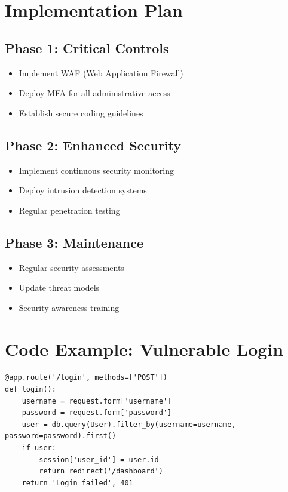 \documentclass{article}
\begin{document}
\section{Implementation Plan}

\subsection{Phase 1: Critical Controls}
\begin{itemize}
    \item Implement WAF (Web Application Firewall)
    \item Deploy MFA for all administrative access
    \item Establish secure coding guidelines
\end{itemize}

\subsection{Phase 2: Enhanced Security}
\begin{itemize}
    \item Implement continuous security monitoring
    \item Deploy intrusion detection systems
    \item Regular penetration testing
\end{itemize}

\subsection{Phase 3: Maintenance}
\begin{itemize}
    \item Regular security assessments
    \item Update threat models
    \item Security awareness training
\end{itemize}


\section{Code Example: Vulnerable Login}

\begin{verbatim}
@app.route('/login', methods=['POST'])
def login():
    username = request.form['username']
    password = request.form['password']
    user = db.query(User).filter_by(username=username, password=password).first()
    if user:
        session['user_id'] = user.id
        return redirect('/dashboard')
    return 'Login failed', 401
\end{verbatim}
\end{document}
